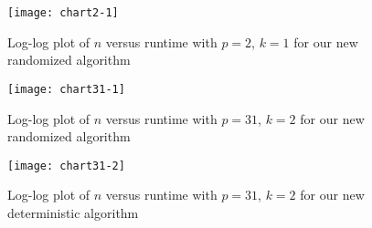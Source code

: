 \documentclass{acmart}
\theoremstyle{remark}
\numberwithin{equation}{section}
\begin{document}
\begin{figure}\label{fig:figure1}
\centering
  \texttt{[image: chart2-1]}
  \caption{Log-log plot of $n$ versus runtime with $p = 2$, $k = 1$ for our new randomized algorithm}
\end{figure}

\begin{figure}\label{fig:figure2}
\centering
  \texttt{[image: chart31-1]}
  \caption{Log-log plot of $n$ versus runtime with $p = 31$, $k = 2$ for our new randomized algorithm}
\end{figure}

\begin{figure}\label{fig:figure3}
\centering
  \texttt{[image: chart31-2]}
  \caption{Log-log plot of $n$ versus runtime with $p = 31$, $k = 2$ for our new deterministic algorithm}
\end{figure}







{}

\end{document}
